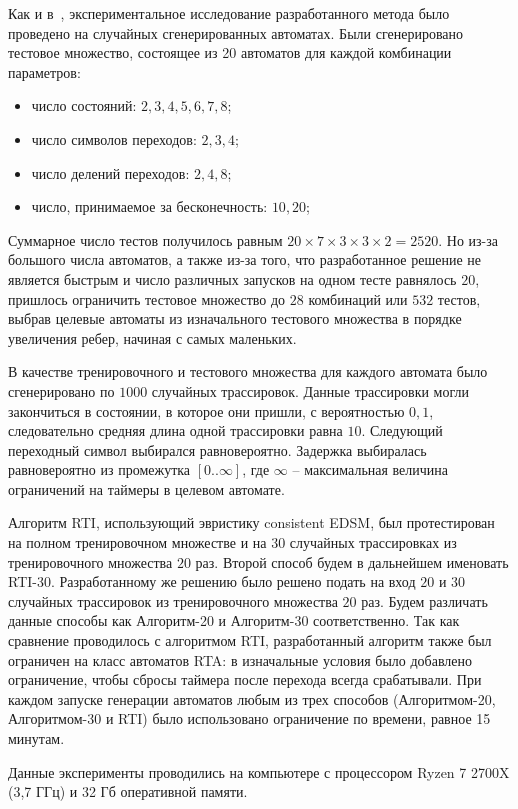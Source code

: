 \documentclass[times,specification,annotation]{itmo-student-thesis}
\begin{document}
Как и в~\cite{rti}, экспериментальное исследование разработанного метода было проведено на случайных сгенерированных автоматах.
Были сгенерировано тестовое множество, состоящее из 20 автоматов для каждой комбинации параметров:
\begin{itemize}
  \item число состояний: $2, 3, 4, 5, 6, 7, 8$;
  \item число символов переходов: $2, 3, 4$;
  \item число делений переходов: $2, 4, 8$;
  \item число, принимаемое за бесконечность: $10, 20$;
\end{itemize}

Суммарное число тестов получилось равным $20 \times 7 \times 3 \times 3 \times 2 = 2520$. Но из-за большого числа автоматов, а также из-за того, что разработанное решение не является быстрым и
число различных запусков на одном тесте равнялось $20$, пришлось ограничить тестовое множество до $28$ комбинаций или $532$ тестов, 
выбрав целевые автоматы из изначального тестового множества в порядке увеличения ребер, начиная с самых маленьких.

В качестве тренировочного и тестового множества для каждого автомата 
было сгенерировано по $1000$ случайных трассировок. Данные трассировки могли закончиться в состоянии, в которое они пришли, с вероятностью $0,1$, следовательно
средняя длина одной трассировки равна $10$. Следующий переходный символ выбирался равновероятно. Задержка выбиралась равновероятно из промежутка $[0..\infty]$, 
где $\infty$ -- максимальная величина ограничений на таймеры в целевом автомате.

Алгоритм RTI, использующий эвристику consistent EDSM, был
протестирован на полном тренировочном множестве и на $30$ случайных трассировках из тренировочного множества $20$ раз. Второй способ будем в дальнейшем именовать RTI-30.
Разработанному же решению было решено подать на вход $20$ и $30$ случайных трассировок из тренировочного множества $20$ раз.
Будем различать данные способы как Алгоритм-20 и Алгоритм-30 соответственно. 
Так как сравнение проводилось с алгоритмом RTI, разработанный алгоритм также был ограничен на класс автоматов RTA:
в изначальные условия было добавлено ограничение, чтобы сбросы таймера после перехода всегда срабатывали. При каждом запуске генерации автоматов любым из трех способов
(Алгоритмом-20, Алгоритмом-30 и RTI) было использовано ограничение по времени, равное 15 минутам. 

Данные эксперименты проводились на компьютере с процессором Ryzen 7 2700X (3,7 ГГц) и 32 Гб оперативной памяти.
\end{document}
